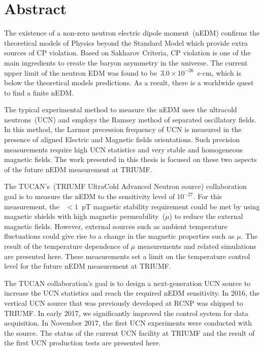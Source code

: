 \documentclass[12pt,a4paper]{book}
\begin{document}
\renewcommand{\thepage}{\roman{page}}
\chapter*{Abstract}
The existence of a non-zero neutron electric dipole moment~(nEDM)
confirms the theoretical models of Physics beyond the Standard Model
which provide extra sources of CP violation. Based on Sakharov
Criteria, CP violation is one of the main ingredients to create the
baryon asymmetry in the universe. The current upper limit of the
neutron EDM was found to be~$3.0 \times 10^{-26}$~e$\cdot$cm, which is
below the theoretical models predictions. As a result, there is a
worldwide quest to find a finite nEDM.

The typical experimental method to measure the nEDM uses the ultracold
neutrons~(UCN) and employs the Ramsey method of separated oscillatory
fields. In this method, the Larmor precession frequency of UCN is
measured in the presence of aligned Electric and Magnetic fields
orientations. Such precision measurements require high UCN statistics
and very stable and homogeneous magnetic fields.  The work presented
in this thesis is focused on these two aspects of the future nEDM
measurement at TRIUMF.

The TUCAN's~(TRIUMF UltraCold Advanced Neutron source) collaboration
goal is to measure the nEDM to the sensitivity level of
$10^{-27}$. For this measurement, the~ $<1$~pT magnetic stability
requirement could be met by using magnetic shields with high magnetic
permeability~($\mu$) to reduce the external magnetic fields. However,
external sources such as ambient temperature fluctuations could give
rise to a change in the magnetic properties such as $\mu$. The result
of the temperature dependence of $\mu$ measurements and related
simulations are presented here.
These measurements set a limit on the temperature control level for
the future nEDM measurement at TRIUMF.

The TUCAN collaboration's goal is to design a next-generation UCN
source to increase the UCN statistics and reach the required nEDM
sensitivity. In 2016, the vertical UCN source that was previously
developed at RCNP was shipped to TRIUMF. In early 2017, we
significantly improved the control system for data acquisition. In
November 2017, the first UCN experiments were conducted with the
source. The status of the current UCN facility at TRIUMF and the
result of the first UCN production tests are presented here.
\end{document}
